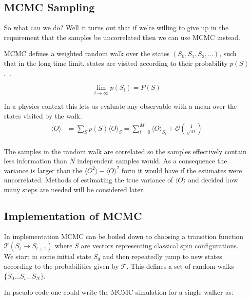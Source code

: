 \hypertarget{mcmc-sampling}{%
\subsection{MCMC Sampling}\label{mcmc-sampling}}

So what can we do? Well it turns out that if we're willing to give up in the requirement that the samples be uncorrelated then we can use MCMC instead.

MCMC defines a weighted random walk over the states \((S_0, S_1, S_2, ...)\), such that in the long time limit, states are visited according to their probability \(p(S)\).~\autocite{binderGuidePracticalWork1988,kerteszAdvancesComputerSimulation1998,wolffMonteCarloErrors2004}. ~\autocite{krauthIntroductionMonteCarlo1998}

\[\lim_{i\to\infty} p(S_i) = P(S)\]

In a physics context this lets us evaluate any observable with a mean over the states visited by the walk. \[\begin{aligned}
\langle O \rangle & = \sum_{S} p(S) \langle O \rangle_{S} = \sum_{i = 0}^{M} \langle O\rangle_{S_i} + \mathcal{O}(\tfrac{1}{\sqrt{M}})\\
\end{aligned}\]

The samples in the random walk are correlated so the samples effectively contain less information than \(N\) independent samples would. As a consequence the variance is larger than the \(\langle O^2 \rangle - \langle O\rangle^2\) form it would have if the estimates were uncorrelated. Methods of estimating the true variance of \(\langle O \rangle\) and decided how many steps are needed will be considered later.

\hypertarget{implementation-of-mcmc}{%
\subsection{Implementation of MCMC}\label{implementation-of-mcmc}}

In implementation MCMC can be boiled down to choosing a transition function \(\mathcal{T}(S_{t} \rightarrow S_{t+1})\) where \(S\) are vectors representing classical spin configurations. We start in some initial state \(S_0\) and then repeatedly jump to new states according to the probabilities given by \(\mathcal{T}\). This defines a set of random walks \(\{S_0\ldots S_i\ldots S_N\}\).

In pseudo-code one could write the MCMC simulation for a single walker as:

